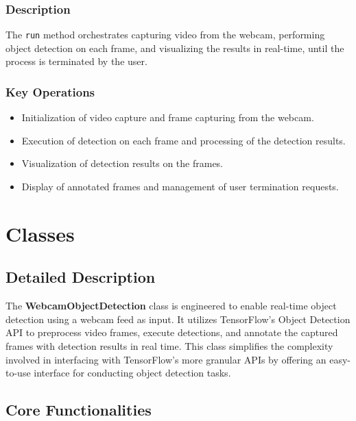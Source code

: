 \subsubsection{Description}
The \texttt{run} method orchestrates capturing video from the webcam, performing object detection on each frame, and visualizing the results in real-time, until the process is terminated by the user.

\subsubsection{Key Operations}
\begin{itemize}
	\item Initialization of video capture and frame capturing from the webcam.
	\item Execution of detection on each frame and processing of the detection results.
	\item Visualization of detection results on the frames.
	\item Display of annotated frames and management of user termination requests.
\end{itemize}

\section{Classes}

\subsection{Detailed Description}

The \textbf{WebcamObjectDetection} class is engineered to enable real-time object detection using a webcam feed as input. It utilizes TensorFlow's Object Detection API to preprocess video frames, execute detections, and annotate the captured frames with detection results in real time. This class simplifies the complexity involved in interfacing with TensorFlow's more granular APIs by offering an easy-to-use interface for conducting object detection tasks.

\subsection{Core Functionalities}

